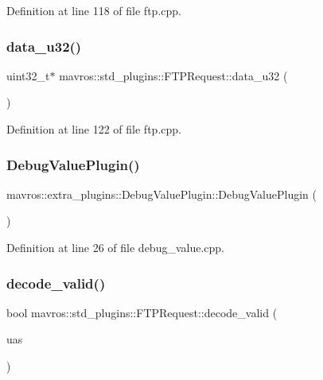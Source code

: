 Definition at line 118 of file ftp.\+cpp.

\mbox{\label{group__plugin_gae1a0d86b63b05cad94daaaf57bd30a60}} 
\subsubsection{\texorpdfstring{data\_u32()}{data\_u32()}}
{\footnotesize\ttfamily uint32\+\_\+t$\ast$ mavros\+::std\+\_\+plugins\+::\+F\+T\+P\+Request\+::data\+\_\+u32 (\begin{DoxyParamCaption}{ }\end{DoxyParamCaption})\hspace{0.3cm}{\ttfamily [inline]}}



Definition at line 122 of file ftp.\+cpp.

\mbox{\label{group__plugin_gaad8fc784bbe6fddeae69c2347b40bdc8}} 
\subsubsection{\texorpdfstring{DebugValuePlugin()}{DebugValuePlugin()}}
{\footnotesize\ttfamily mavros\+::extra\+\_\+plugins\+::\+Debug\+Value\+Plugin\+::\+Debug\+Value\+Plugin (\begin{DoxyParamCaption}{ }\end{DoxyParamCaption})\hspace{0.3cm}{\ttfamily [inline]}}



Definition at line 26 of file debug\+\_\+value.\+cpp.

\mbox{\label{group__plugin_gab4fea3506785f409afdfb0917bab879f}} 
\subsubsection{\texorpdfstring{decode\_valid()}{decode\_valid()}}
{\footnotesize\ttfamily bool mavros\+::std\+\_\+plugins\+::\+F\+T\+P\+Request\+::decode\+\_\+valid (\begin{DoxyParamCaption}\item[{\mbox{\hyperlink{classmavros_1_1UAS}{U\+AS}} $\ast$}]{uas }\end{DoxyParamCaption})\hspace{0.3cm}{\ttfamily [inline]}}



